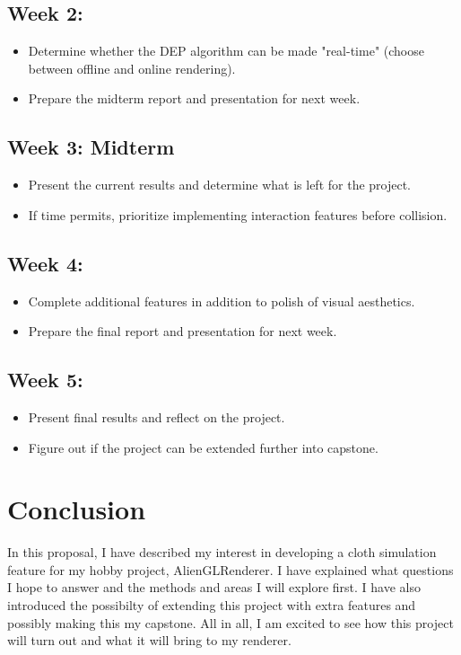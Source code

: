 \documentclass[letterpaper, 10 pt, conference, english]{ieeeconf}  %
\begin{document}
        \subsection*{Week 2:}
                \begin{itemize}
                        \item Determine whether the DEP algorithm can be made "real-time" (choose between offline and online rendering).
                        
                        \item Prepare the midterm report and presentation for next week.
                \end{itemize}
        \subsection*{Week 3: Midterm}
                \begin{itemize}
                        \item Present the current results and determine what is left for the project. 
                        \item If time permits, prioritize implementing interaction features before collision.
                \end{itemize}
        \subsection*{Week 4:}
                \begin{itemize}
                        \item Complete additional features in addition to polish of visual aesthetics.
                        \item Prepare the final report and presentation for next week.
                \end{itemize}
        \subsection*{Week 5:}
                \begin{itemize}
                        \item Present final results and reflect on the project.
                        \item Figure out if the project can be extended further into capstone.
                \end{itemize}


\section{Conclusion}
In this proposal, I have described my interest in developing a cloth simulation feature for my hobby project, AlienGLRenderer. I have explained what questions I hope to answer and the methods and areas I will explore first. I have also introduced the possibilty of extending this project with extra features and possibly making this my capstone. All in all, I am excited to see how this project will turn out and what it will bring to my renderer.
\end{document}
